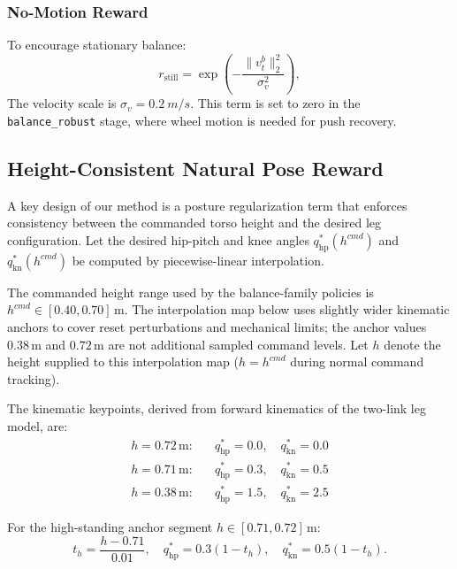 \documentclass[conference]{IEEEtran}
\begin{document}
\subsubsection{No-Motion Reward}
To encourage stationary balance:
\begin{equation}
r_{\mathrm{still}} =
\exp\!\left(
-\frac{\|v_t^b\|_2^2}{\sigma_v^2}
\right),
\label{eq:no_motion}
\end{equation}
The velocity scale is $\sigma_v = \SI{0.2}{m/s}$.
This term is set to zero in the \texttt{balance\_robust} stage,
where wheel motion is needed for push recovery.

\subsection{Height-Consistent Natural Pose Reward}
\label{sec:natural_pose}
A key design of our method is a posture regularization term that enforces
consistency between the commanded torso height and the desired leg
configuration.
Let the desired hip-pitch and knee angles
$q_{\mathrm{hp}}^*(h^{cmd})$ and $q_{\mathrm{kn}}^*(h^{cmd})$
be computed by piecewise-linear interpolation.

The commanded height range used by the balance-family policies is
$h^{cmd} \in [0.40, 0.70]\,\mathrm{m}$.  The interpolation map below
uses slightly wider kinematic anchors to cover reset perturbations and
mechanical limits; the anchor values $0.38\,\mathrm{m}$ and
$0.72\,\mathrm{m}$ are not additional sampled command levels.
Let $h$ denote the height supplied to this interpolation map
($h = h^{cmd}$ during normal command tracking).

The kinematic keypoints, derived from forward kinematics of the two-link
leg model, are:
\begin{align*}
h = 0.72\,\mathrm{m}\text{:} &\quad q_{\mathrm{hp}}^* = 0.0,\quad q_{\mathrm{kn}}^* = 0.0 \\
h = 0.71\,\mathrm{m}\text{:} &\quad q_{\mathrm{hp}}^* = 0.3,\quad q_{\mathrm{kn}}^* = 0.5 \\
h = 0.38\,\mathrm{m}\text{:} &\quad q_{\mathrm{hp}}^* = 1.5,\quad q_{\mathrm{kn}}^* = 2.5
\end{align*}

For the high-standing anchor segment
$h \in [0.71, 0.72]\,\mathrm{m}$:
\begin{equation}
t_h = \frac{h - 0.71}{0.01},
\quad
q_{\mathrm{hp}}^* = 0.3(1 - t_h),
\quad
q_{\mathrm{kn}}^* = 0.5(1 - t_h).
\end{equation}
\end{document}
